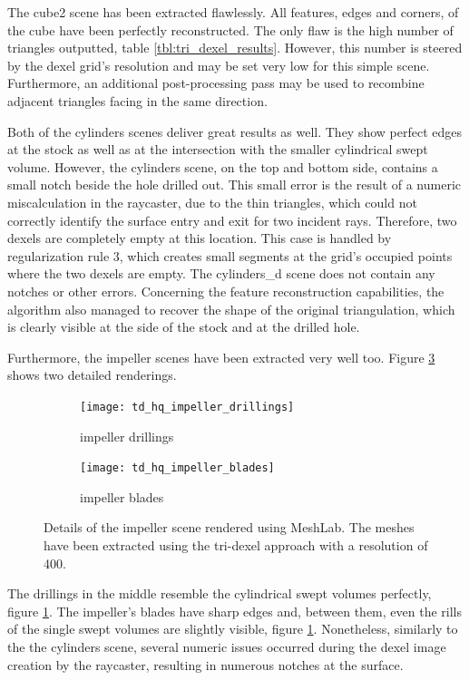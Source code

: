 %
The cube2 scene has been extracted flawlessly.
All features, \ie edges and corners, of the cube have been perfectly reconstructed.
The only flaw is the high number of triangles outputted, \cf table \ref{tbl:tri_dexel_results}.
However, this number is steered by the dexel grid's resolution and may be set very low for this simple scene.
Furthermore, an additional post-processing pass may be used to recombine adjacent triangles facing in the same direction.

Both of the cylinders scenes deliver great results as well.
They show perfect edges at the stock as well as at the intersection with the smaller cylindrical swept volume.
However, the cylinders scene, on the top and bottom side, contains a small notch beside the hole drilled out.
This small error is the result of a numeric miscalculation in the raycaster, due to the thin triangles, which could not correctly identify the surface entry and exit for two incident rays.
Therefore, two dexels are completely empty at this location.
This case is handled by regularization rule 3, which creates small segments at the grid's occupied points where the two dexels are empty.
The cylinders\_d scene does not contain any notches or other errors.
Concerning the feature reconstruction capabilities, the algorithm also managed to recover the shape of the original triangulation, which is clearly visible at the side of the stock and at the drilled hole.

Furthermore, the impeller scenes have been extracted very well too.
Figure \ref{fig:td_hq_impeller_details} shows two detailed renderings.
%
\begin{figure}
	\centering
	\begin{subfigure}[b]{0.49\textwidth}
		\centering
		\texttt{[image: td\_hq\_impeller\_drillings]}
		\caption{impeller drillings}
		\label{fig:td_hq_impeller_drillings}
	\end{subfigure}
	\begin{subfigure}[b]{0.49\textwidth}
		\centering
		\texttt{[image: td\_hq\_impeller\_blades]}
		\caption{impeller blades}
		\label{fig:td_hq_impeller_blades}
	\end{subfigure}
	\caption{
		Details of the impeller scene rendered using MeshLab.
		The meshes have been extracted using the tri-dexel approach with a resolution of 400.
	}
	\label{fig:td_hq_impeller_details}
\end{figure}
%
The drillings in the middle resemble the cylindrical swept volumes perfectly, \cf figure \ref{fig:td_hq_impeller_drillings}.
The impeller's blades have sharp edges and, between them, even the rills of the single swept volumes are slightly visible, \cf figure \ref{fig:td_hq_impeller_drillings}.
Nonetheless, similarly to the the cylinders scene, several numeric issues occurred during the dexel image creation by the raycaster, resulting in numerous notches at the surface.

